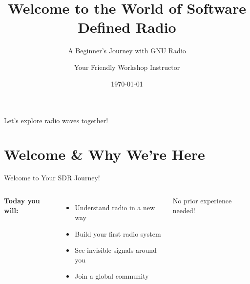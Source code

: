 \documentclass[aspectratio=169,11pt]{beamer}
\title{Welcome to the World of Software Defined Radio}
\subtitle{A Beginner's Journey with GNU Radio}
\author{Your Friendly Workshop Instructor}
\institute{GRCon 2025}
\date{\today}
\begin{document}
\begin{frame}
\titlepage
\begin{center}
\Large\textcolor{radioblue}{Let's explore radio waves together!}
\end{center}
\end{frame}


\section{Welcome \& Why We're Here}

\begin{frame}{Welcome to Your SDR Journey!}
\begin{columns}
\Large
\textbf{Today you will:}
\begin{itemize}
    \item Understand radio in a new way
    \item Build your first radio system
    \item See invisible signals around you
    \item Join a global community
\end{itemize}
\vspace{1em}
\normalsize
\textcolor{radiogreen}{No prior experience needed!}

\end{columns}
\end{frame}
\end{document}
